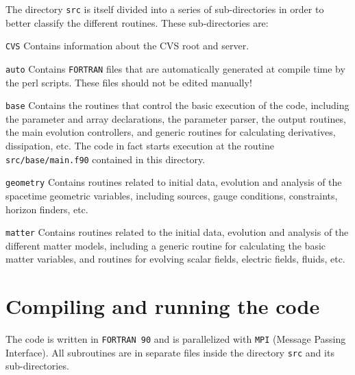 \documentclass[12pt]{article}
\begin{document}
\vspace{3mm}

The directory \texttt{src} is itself divided into a series of
sub-directories in order to better classify the different
routines. These sub-directories are:

\begin{list}{}{
\setlength{\leftmargin}{40mm}
\setlength{\labelsep}{10mm}
\setlength{\labelwidth}{25mm}}

\item[\texttt{CVS}] Contains information about the CVS root and server.

\item[\texttt{auto}] Contains \texttt{FORTRAN} files that are
  automatically generated at compile time by the perl scripts.  These
  files should not be edited manually!

\item[\texttt{base}] Contains the routines that control the basic
  execution of the code, including the parameter and array
  declarations, the parameter parser, the output routines, the main
  evolution controllers, and generic routines for calculating
  derivatives, dissipation, etc.  The code in fact starts execution at
  the routine \texttt{src/base/main.f90} contained in this directory.

\item[\texttt{geometry}] Contains routines related to initial data,
  evolution and analysis of the spacetime geometric variables,
  including sources, gauge conditions, constraints, horizon finders,
  etc.

\item[\texttt{matter}] Contains routines related to the initial data,
  evolution and analysis of the different matter models, including a
  generic routine for calculating the basic matter variables, and
  routines for evolving scalar fields, electric fields, fluids, etc.

\end{list}

\vspace{3mm}



\section{Compiling and running the code}

The code is written in \texttt{FORTRAN 90} and is parallelized with
\texttt{MPI} (Message Passing Interface).  All subroutines are in
separate files inside the directory \texttt{src} and its
sub-directories.
\end{document}
